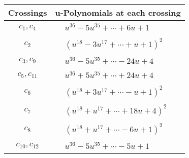 \documentclass[1p]{elsarticle_modified}
\theoremstyle{definition}
\begin{document}
\begin{tabular}{m{50pt}|m{274pt}}
Crossings & \hspace{64pt}u-Polynomials at each crossing \\
\hline $$\begin{aligned}c_{1},c_{4}\end{aligned}$$&$\begin{aligned}
&u^{36}-5 u^{35}+\cdots+6 u+1
\end{aligned}$\\
\hline $$\begin{aligned}c_{2}\end{aligned}$$&$\begin{aligned}
&(u^{18}-3 u^{17}+\cdots+u+1)^{2}
\end{aligned}$\\
\hline $$\begin{aligned}c_{3},c_{9}\end{aligned}$$&$\begin{aligned}
&u^{36}-5 u^{35}+\cdots-24 u+4
\end{aligned}$\\
\hline $$\begin{aligned}c_{5},c_{11}\end{aligned}$$&$\begin{aligned}
&u^{36}+5 u^{35}+\cdots+24 u+4
\end{aligned}$\\
\hline $$\begin{aligned}c_{6}\end{aligned}$$&$\begin{aligned}
&(u^{18}+3 u^{17}+\cdots- u+1)^{2}
\end{aligned}$\\
\hline $$\begin{aligned}c_{7}\end{aligned}$$&$\begin{aligned}
&(u^{18}+u^{17}+\cdots+18 u+4)^{2}
\end{aligned}$\\
\hline $$\begin{aligned}c_{8}\end{aligned}$$&$\begin{aligned}
&(u^{18}+u^{17}+\cdots-6 u+1)^{2}
\end{aligned}$\\
\hline $$\begin{aligned}c_{10},c_{12}\end{aligned}$$&$\begin{aligned}
&u^{36}-5 u^{35}+\cdots-5 u+1
\end{aligned}$\\
\hline
\end{tabular}\\~\\
\end{document}
